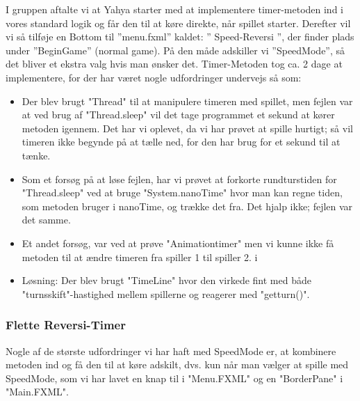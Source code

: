 I gruppen aftalte vi at Yahya starter med at implementere timer-metoden ind i vores standard logik og får den til at køre direkte, når spillet starter. Derefter vil vi så tilføje en Bottom til ”menu.fxml” kaldet: ” Speed-Reversi ”, der finder plads under ”BeginGame” (normal game).
På den måde adskiller vi ”SpeedMode”, så det bliver et ekstra valg hvis man ønsker det. 
Timer-Metoden tog ca. 2 dage at implementere, for der har været nogle udfordringer undervejs så som: 
\begin{itemize}

\item Der blev brugt "Thread" til at manipulere timeren med spillet, men fejlen var at ved brug af "Thread.sleep" vil det tage programmet et sekund at kører metoden igennem. Det har vi oplevet, da vi har prøvet at spille hurtigt; så vil timeren ikke begynde på at tælle ned, for den har brug for et sekund til at tænke. 
\item Som et forsøg på at løse fejlen, har vi prøvet at forkorte rundturstiden for "Thread.sleep" ved at bruge "System.nanoTime" hvor man kan regne tiden, som metoden bruger i nanoTime, og trække det fra. Det hjalp ikke; fejlen var det samme. 
\item Et andet forsøg, var ved at prøve "Animationtimer" men vi kunne ikke få metoden til at ændre timeren fra spiller 1 til spiller 2. 
 i 
\item Løsning: 
Der blev brugt "TimeLine" hvor den virkede fint med både "turnsskift"-hastighed mellem spillerne og reagerer med "getturn()". 
\end{itemize}
\subsubsection{Flette Reversi-Timer}\label{FRT}
Nogle af de største udfordringer vi har haft med SpeedMode er, at kombinere metoden ind og få den til at køre adskilt, dvs. kun når man vælger at spille med SpeedMode, som vi har lavet en knap til i "Menu.FXML" og en "BorderPane" i "Main.FXML".
